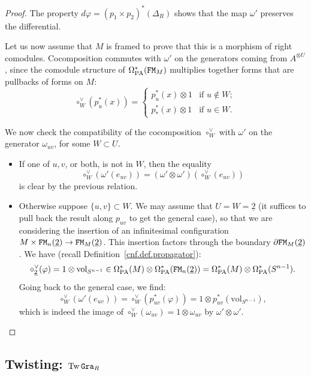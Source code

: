 \begin{proof}
  The property $d \varphi = (p_{1} \times p_{2})^{*}(\Delta_{R})$ shows that the map $\omega'$ preserves the differential.

  Let us now assume that $M$ is framed to prove that this is a morphism of right comodules.
  Cocomposition commutes with $\omega'$ on the generators coming from $A^{\otimes U}$, since the comodule structure of $\Omega_{\mathrm{PA}}^{*}(\mathtt{FM}_{M})$ multiplies together forms that are pullbacks of forms on $M$:
  \[ \circ_{W}^{\vee}(p_{u}^{*}(x)) = \begin{cases}
      p_{u}^{*}(x) \otimes 1 & \text{if } u \not\in W; \\
      p_{*}^{*}(x) \otimes 1 & \text{if } u \in W.
    \end{cases} \]

  We now check the compatibility of the cocomposition $\circ_{W}^{\vee}$ with $\omega'$ on the generator $\omega_{uv}$, for some $W \subset U$.
  \begin{itemize}
  \item If one of $u,v$, or both, is not in $W$, then the equality
    \[ \circ_{W}^{\vee}(\omega'(e_{uv})) = (\omega' \otimes \omega')(\circ_{W}^{\vee}(e_{uv})) \]
    is clear by the previous relation.
  \item  Otherwise suppose $\{u,v\} \subset W$.
    We may assume that $U = W = \underline{2}$ (it suffices to pull back the result along $p_{uv}$ to get the general case), so that we are considering the insertion of an infinitesimal configuration $M \times \mathtt{FM}_{n}(\underline{2}) \to \mathtt{FM}_{M}(\underline{2})$.
    This insertion factors through the boundary $\partial \mathtt{FM}_{M}(\underline{2})$.
    We have (recall Definition~\ref{cnf.def.propagator}):
    \[ \circ_{\underline{2}}^{\vee}(\varphi) = 1 \otimes \mathrm{vol}_{S^{n-1}} \in \Omega_{\mathrm{PA}}^{*}(M) \otimes \Omega_{\mathrm{PA}}^{*}(\mathtt{FM}_{n}(\underline{2})) = \Omega_{\mathrm{PA}}^{*}(M) \otimes \Omega_{\mathrm{PA}}^{*}(S^{n-1}).
    \]
    Going back to the general case, we find:
    \[ \circ_{W}^{\vee}(\omega'(e_{uv})) = \circ_{W}^{\vee}(p_{uv}^{*}(\varphi)) = 1 \otimes p_{uv}^{*}(\mathrm{vol}_{S^{n-1}}), \]
    which is indeed the image of $\circ_{W}^{\vee}(\omega_{uv}) = 1 \otimes \omega_{uv}$ by $\omega' \otimes \omega'$.
    \qedhere
\end{itemize}
\end{proof}

\subsection{Twisting: \texorpdfstring{$\operatorname{Tw}\mathtt{Gra}_{R}$}{Tw Gra\_R}}
\label{cnf.sec.twisting-twgra_r}

